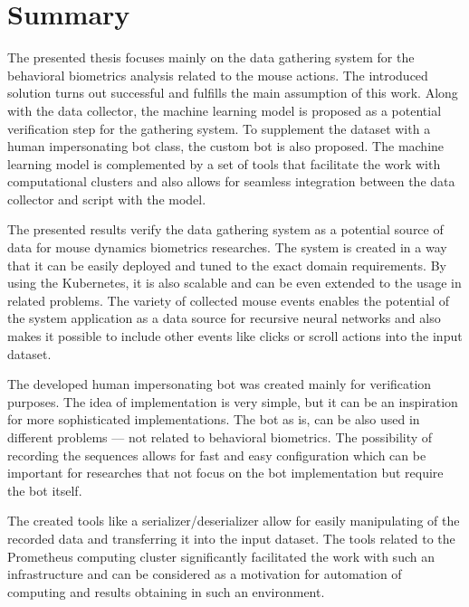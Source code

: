 \section{Summary}\label{sec:summary}
The presented thesis focuses mainly on the data gathering system for the behavioral biometrics analysis related to the mouse actions.
The introduced solution turns out successful and fulfills the main assumption of this work.
Along with the data collector, the machine learning model is proposed as a potential verification step for the gathering system.
To supplement the dataset with a human impersonating bot class, the custom bot is also proposed.
The machine learning model is complemented by a set of tools that facilitate the work with computational clusters and also allows for seamless integration between the data collector and script with the model.

The presented results verify the data gathering system as a potential source of data for mouse dynamics biometrics researches.
The system is created in a way that it can be easily deployed and tuned to the exact domain requirements.
By using the Kubernetes, it is also scalable and can be even extended to the usage in related problems.
The variety of collected mouse events enables the potential of the system application as a data source for recursive neural networks and also makes it possible to include other events like clicks or scroll actions into the input dataset.

The developed human impersonating bot was created mainly for verification purposes.
The idea of implementation is very simple, but it can be an inspiration for more sophisticated implementations.
The bot as is, can be also used in different problems --- not related to behavioral biometrics.
The possibility of recording the sequences allows for fast and easy configuration which can be important for researches that not focus on the bot implementation but require the bot itself.

The created tools like a serializer/deserializer allow for easily manipulating of the recorded data and transferring it into the input dataset.
The tools related to the Prometheus computing cluster significantly facilitated the work with such an infrastructure and can be considered as a motivation for automation of computing and results obtaining in such an environment.

